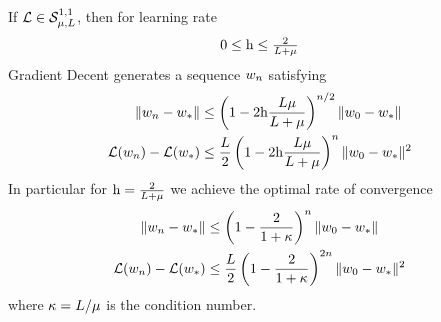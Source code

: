 \begin{theorem}
	\label{thm: gd strong convexity convergence rate}
	If \(\mathcal{L}\in\mathcal{S}^{1,1}_{{\mu},{L}}\), then for learning rate
	\[0 \le \text{h} \le \tfrac{2}{L+\mu}\]
	Gradient Decent generates a sequence \(w_n\) satisfying
	\begin{subequations}
	\begin{align}
		\label{eq: gd strong convexity convergence rate 1}
		\|w_n - w_*\|
		&\le \left(
			1- 2\text{h}\frac{L\mu}{L+\mu}
		\right)^{n/2}
		\|w_0 - w_*\| \\
		\label{eq: gd strong convexity convergence rate 2}
		\mathcal{L}(w_n) - \mathcal{L}(w_*)
		&\le \frac{L}{2} \left(
			1- 2\text{h}\frac{L\mu}{L+\mu}
		\right)^{n}
		\|w_0 - w_*\|^2
	\end{align}
	\end{subequations}
	In particular for \(\text{h}=\tfrac2{L+\mu}\) we achieve the optimal
	rate of convergence
	\begin{subequations}\label{eq: gd strong convexity optimal rate}
	\begin{align}
		\|w_n - w_*\|
		&\le \left(
			1- \frac{2}{1+\kappa}
		\right)^n
		\|w_0 - w_*\| \\
		\mathcal{L}(w_n) - \mathcal{L}(w_*)
		&\le \frac{L}{2} \left(
			1- \frac{2}{1+\kappa}
		\right)^{2n}
		\|w_0 - w_*\|^2
	\end{align}
	\end{subequations}
	where \(\kappa=L/\mu\) is the condition number.
\end{theorem}
